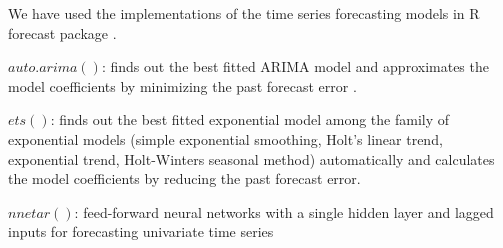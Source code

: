 We have used the implementations of the time series forecasting models in R forecast package  \cite{forecastPackage}.

$auto.arima()$:  finds out the best fitted ARIMA model and approximates the model coefficients by minimizing the past forecast error \cite{Forecasting_OTexts}.

$ets()$: finds out the best fitted exponential model among the family of exponential models (simple exponential smoothing, Holt's linear trend, exponential trend, Holt-Winters seasonal method) automatically and calculates the model coefficients by reducing the past forecast error. \cite{Forecasting_OTexts}
    
$nnetar()$: feed-forward neural networks with a single hidden layer and lagged inputs for forecasting univariate time series